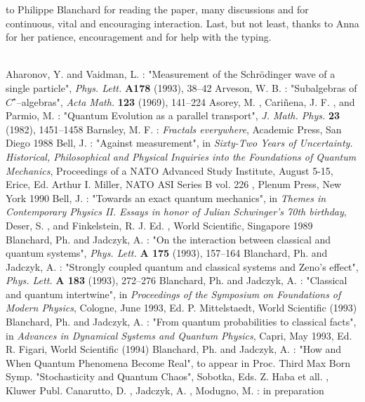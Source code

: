 \documentclass[12pt]{article}
\begin{document}
to Philippe Blanchard for reading the paper, many discussions and
for continuous, vital and encouraging interaction. 
 Last,  but not least,  thanks to Anna for her patience, 
 encouragement and for help with
the typing. 
\\ \\
\begin{thebibliography}{99}
 Aharonov,  Y.  and Vaidman,  L.  : "Measurement of the Schr\"odinger
wave of a single particle", {\sl Phys.  Lett.  }{\bf A178} (1993), 38--42
 Arveson,  W.  B.  : "Subalgebras of $C^{\star}$--algebras", 
{\sl Acta Math. }{\bf 123} (1969), 141--224
 Asorey,  M. ,  Cari\~nena,  J. F. ,  and Parmio,  M. : 
"Quantum Evolution as a parallel transport",  {\sl J. Math. Phys. }{\bf 23} (1982), 
1451--1458
 Barnsley,  M. F. : {\sl Fractals everywhere},  Academic Press,  San
Diego 1988
 Bell,  J. : "Against measurement", in
{\sl Sixty-Two Years of Uncertainty. Historical, Philosophical and
Physical Inquiries into the Foundations of Quantum Mechanics}, Proceedings
of a NATO Advanced Study Institute, August 5-15, Erice, Ed. Arthur I. Miller,
NATO ASI Series B vol. 226 , Plenum Press, New York 1990 
 Bell,  J. : "Towards an exact quantum mechanics",  in
{\sl Themes in Contemporary Physics II.  Essays in honor of Julian
Schwinger's 70th birthday},  Deser,  S. ,  and Finkelstein,  R. J.  Ed. , 
World Scientific,  Singapore 1989
 Blanchard,  Ph.  and Jadczyk,  A. : "On the interaction
between classical and quantum systems", {\sl Phys. Lett. }{\bf A
175} (1993), 157--164
 Blanchard,  Ph.  and Jadczyk,  A. : "Strongly coupled
quantum and classical systems and Zeno's effect", {\sl
Phys. Lett. }{\bf A 183} (1993), 272--276
  Blanchard,  Ph.  and Jadczyk,  A. : "Classical and quantum
intertwine",  in {\sl Proceedings of the Symposium on Foundations of
Modern Physics},  Cologne,  June 1993,  Ed.  P.  Mittelstaedt,  World
Scientific  (1993)
 Blanchard,  Ph.  and Jadczyk,  A. : "From quantum
probabilities to classical facts",  in {\sl Advances in Dynamical
Systems and Quantum Physics},  Capri,  May 1993,  Ed.  R.  Figari,  World
Scientific  (1994) 
 Blanchard,  Ph.  and Jadczyk,  A. :  "How and
When Quantum Phenomena Become Real",  to appear in Proc. 
Third Max Born Symp.  "Stochasticity and Quantum Chaos", 
Sobotka,  Eds.  Z.  Haba et all. ,  Kluwer Publ. 
Canarutto,  D. ,  Jadczyk,  A. ,  Modugno,  M. :  in preparation

\end{thebibliography}
\end{document}
